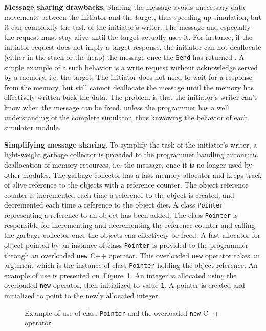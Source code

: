 
\textbf{Message sharing drawbacks}. Sharing the message avoids
unecessary data movements between the initiator and the target, thus
speeding up simulation, but it can complexify the task of the
initiator's writer. The message and especially the request must stay
alive until the target actually uses it. For instance, if the initiator
request does not imply a target response, the initiator can not
deallocate (either in the stack or the heap) the message once the
\texttt{Send} has returned . A simple example of a such behavior is a
write request without acknowledge served by a memory, i.e. the target.
The initiator does not need to wait for a response from the memory,
but still cannot deallocate the message until the memory has
effectively written back the data. The problem is that the initiator's
writer can't know when the message can be freed, unless the
programmer has a well understanding of the complete simulator, thus
knwowing the behavior of each simulator module.

\textbf{Simplifying message sharing}. To symplify the task of the
initiator's writer, a light-weight garbage collector is provided to
the programmer handling automatic deallocation of memory resources,
i.e. the message, once it is no longer used by other modules. The
garbage collector has a fast memory allocator and keeps track of alive
reference to the objects with a reference counter. The object
reference counter is incremented each time a reference to the object
is created, and decremented each time a reference to the object dies.
A class \texttt{Pointer} representing a reference to an object has
been added. The class \texttt{Pointer} is responsible for incrementing
and decrementing the reference counter and calling the garbage
collector once the objects can effectively be freed. A fast allocator
for object pointed by an instance of class \texttt{Pointer} is
provided to the programmer through an overloaded \texttt{new} C++
operator. This overloaded \texttt{new} operator takes an argument which
is the instance of class \texttt{Pointer} holding the object
reference. An example of use is presented
on~Figure~\ref{fig:new_operator}. An integer is allocated using the
overloaded \texttt{new} operator, then initialized to value
\texttt{1}. A pointer is created and initialized to point to the newly
allocated integer.

\begin{figure}[h]
  \begin{center}
    
    \caption{\label{fig:new_operator} Example of use of class
      \texttt{Pointer} and the overloaded \texttt{new} C++ operator.}
  \end{center}
\end{figure}

